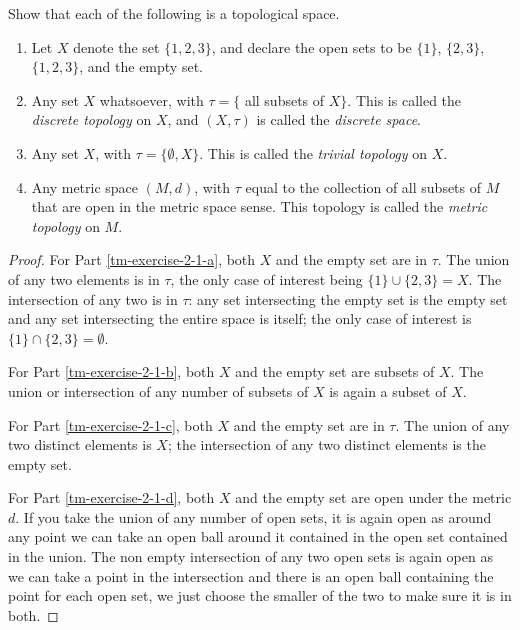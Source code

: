 \begin{exercise}
\label{tm-exercise-2-1}

Show that each of the following is a topological space.

\begin{enumerate}
\item Let $X$ denote the set $\{1, 2, 3\}$, and declare the open sets to be
$\{1\}$, $\{2, 3\}$, $\{1, 2, 3\}$, and the empty set.
\label{tm-exercise-2-1-a}
\item Any set $X$ whatsoever, with $\tau = \{$ all subsets of $X\}$. This is
called the {\it discrete topology} on $X$, and $(X, \tau)$ is called the
{\it discrete space}. \label{tm-exercise-2-1-b}
\item Any set $X$, with $\tau = \{\emptyset, X\}$. This is called the {\it
trivial topology} on $X$. \label{tm-exercise-2-1-c}
\item Any metric space $(M, d)$, with $\tau$ equal to the collection of all
subsets of $M$ that are open in the metric space sense. This topology is called
the {\it metric topology} on $M$.\label{tm-exercise-2-1-d}
\end{enumerate}

\begin{proof}

For Part \ref{tm-exercise-2-1-a}, both $X$ and the empty set are in $\tau$.
The union of any two elements is in $\tau$, the only case of interest being
$\{1\} \cup \{2, 3\} = X$. The intersection of any two is in $\tau$: any set
intersecting the empty set is the empty set and any set intersecting the entire
space is itself; the only case of interest is $\{1\} \cap \{2, 3\} = \emptyset$.

For Part \ref{tm-exercise-2-1-b}, both $X$ and the empty set are subsets of $X$.
The union or intersection of any number of subsets of $X$ is again a subset of
$X$.

For Part \ref{tm-exercise-2-1-c}, both $X$ and the empty set are in $\tau$.
The union of any two distinct elements is $X$; the intersection of any two
distinct elements is the empty set.

For Part \ref{tm-exercise-2-1-d}, both $X$ and the empty set are open under the
metric $d$. If you take the union of any number of open sets, it is again open
as around any point we can take an open ball around it contained in the open
set contained in the union. The non empty intersection of any two open sets is
again open as we can take a point in the intersection and there is an open
ball containing the point for each open set, we just choose the smaller of the
two to make sure it is in both.

\end{proof}

\end{exercise}







